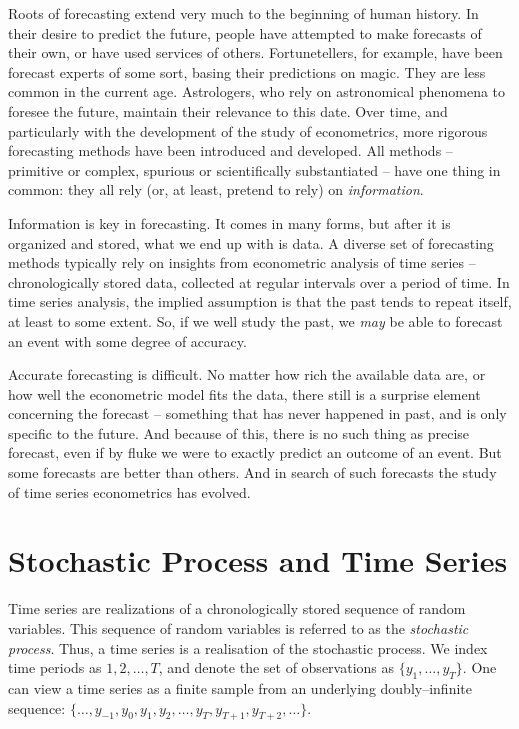 \documentclass[
  oneside]{book}
\begin{document}
Roots of forecasting extend very much to the beginning of human history. In their desire to predict the future, people have attempted to make forecasts of their own, or have used services of others. Fortunetellers, for example, have been forecast experts of some sort, basing their predictions on magic. They are less common in the current age. Astrologers, who rely on astronomical phenomena to foresee the future, maintain their relevance to this date. Over time, and particularly with the development of the study of econometrics, more rigorous forecasting methods have been introduced and developed. All methods -- primitive or complex, spurious or scientifically substantiated -- have one thing in common: they all rely (or, at least, pretend to rely) on \emph{information}.

Information is key in forecasting. It comes in many forms, but after it is organized and stored, what we end up with is data. A diverse set of forecasting methods typically rely on insights from econometric analysis of time series -- chronologically stored data, collected at regular intervals over a period of time. In time series analysis, the implied assumption is that the past tends to repeat itself, at least to some extent. So, if we well study the past, we \emph{may} be able to forecast an event with some degree of accuracy.

Accurate forecasting is difficult. No matter how rich the available data are, or how well the econometric model fits the data, there still is a surprise element concerning the forecast -- something that has never happened in past, and is only specific to the future. And because of this, there is no such thing as precise forecast, even if by fluke we were to exactly predict an outcome of an event. But some forecasts are better than others. And in search of such forecasts the study of time series econometrics has evolved.

\hypertarget{stochastic-process-and-time-series}{%
\chapter{Stochastic Process and Time Series}\label{stochastic-process-and-time-series}}

Time series are realizations of a chronologically stored sequence of random variables. This sequence of random variables is referred to as the \emph{stochastic process}. Thus, a time series is a realisation of the stochastic process. We index time periods as \(1,2,\ldots,T\), and denote the set of observations as \(\{y_1,\ldots,y_T\}\). One can view a time series as a finite sample from an underlying doubly--infinite sequence: \(\{\ldots,y_{-1},y_{0},y_1,y_2,\ldots,y_T,y_{T+1},y_{T+2},\ldots\}\).
\end{document}
